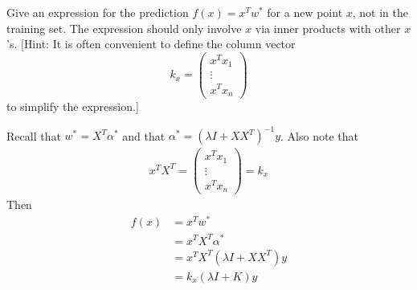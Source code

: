 \documentclass[12pt,letterpaper]{article}
\begin{document}
\begin{problem}{3.6}
     Give an expression for the prediction $f(x)=x^{T}w^{*}$ for a new
    point $x$, not in the training set. The expression should only involve
    $x$ via inner products with other $x$'s. {[}Hint: It is often convenient
    to define the column vector
    \[
    k_{x}=\begin{pmatrix}x^{T}x_{1}\\
    \vdots\\
    x^{T}x_{n}
    \end{pmatrix}
    \]
    to simplify the expression.{]}
\end{problem}
\begin{solution}{}
    Recall that $w^* = X^T\alpha^*$ and that $\alpha^* = (\lambda I + XX^T)^{-1}y$.
    Also note that
    \begin{align*}
        x^TX^T = \begin{pmatrix}x^{T}x_{1}\\
                    \vdots\\
                    x^{T}x_{n}
                    \end{pmatrix} = k_x
    \end{align*}
    Then
    \begin{align*}
        f(x) &= x^Tw^*\\
        &= x^TX^T\alpha^*\\
        &= x^TX^T(\lambda I + XX^T)y\\
        &= k_x(\lambda I + K)y
    \end{align*}
    
\end{solution}
\end{document}
